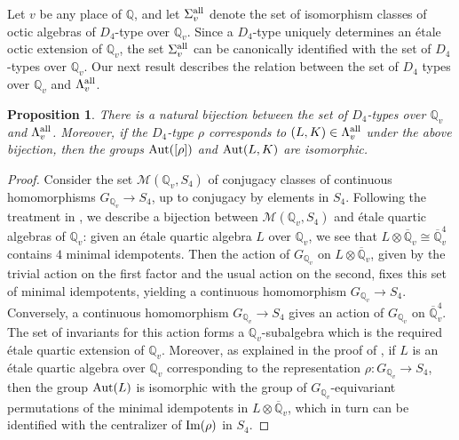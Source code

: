 \documentclass[10pt]{article}
\theoremstyle{plain}
\newtheorem{proposition}[thm]{Proposition}
\theoremstyle{definition}
\theoremstyle{remark}
\DeclareMathOperator{\Aut}{Aut}
\def\all{{\rm all}}
\def\Aut{{\rm Aut}}
\def\Q{{\mathbb Q}}
\def\Q{{\mathbb Q}}
\begin{document}
Let $v$ be any place of $\Q$, and 
let $\Sigma_v^\all$ denote the set of isomorphism classes of octic
algebras of $D_4$-type over $\Q_v$. Since a $D_4$-type uniquely determines an \'etale octic extension of $\Q_v$, the set $\Sigma_v^\all$ can be canonically identified with the set of $D_4$-types over $\Q_v$. Our next result describes the relation between the set of $D_4$ types over $\Q_v$ and $\Lambda_v^\all$. 
\begin{proposition}\label{prop:LambtoSig}
There is a natural bijection between the set of $D_4$-types over $\Q_v$ and $\Lambda_v^\all$. Moreover, if the $D_4$-type $\rho$ corresponds to $(L,K)\in\Lambda_v^\all$ under the above bijection, then the groups $\Aut([\rho])$ and $\Aut(L,K)$ are isomorphic.
\end{proposition}
\begin{proof}
Consider the set $\mathcal{M}(\Q_v,S_4)$ of conjugacy classes of continuous homomorphisms $G_{\Q_v}\to S_4$, up to conjugacy by elements in $S_4$. Following the treatment in \cite[Lemma 3.1]{MR2354797}, we describe a bijection between $\mathcal{M}(\Q_v,S_4)$ and \'etale quartic algebras of $\Q_v$: given an \'etale quartic algebra $L$ over $\Q_v$, we see that $L\otimes\overline{\Q}_v\cong\overline{\Q}_v^4$ contains $4$ minimal idempotents. Then the action of $G_{\Q_v}$ on $L\otimes\overline{\Q}_v$, given by the trivial action on the first factor and the usual action on the second, fixes this set of minimal idempotents, yielding a continuous homomorphism $G_{\Q_v}\to S_4$. Conversely, 
a continuous homomorphism $G_{\Q_v}\to S_4$ gives an action of $G_{\Q_v}$ on $\overline{\Q}_v^4$. The set of invariants for this action forms a $\Q_v$-subalgebra which is the required \'etale quartic extension of $\Q_v$. Moreover, as explained in the proof of \cite[Lemma 3.2]{MR2354797}, if $L$ is an \'etale quartic algebra over $\Q_v$ corresponding to the representation $\rho:G_{\Q_v}\to S_4$, then the group $\Aut(L)$ is isomorphic with the group of $G_{\Q_v}$-equivariant permutations of the minimal idempotents in $L\otimes\overline{\Q}_v$, which in turn can be identified with the centralizer of $\rm{Im}(\rho)$ in $S_4$.


\end{proof}
\end{document}
